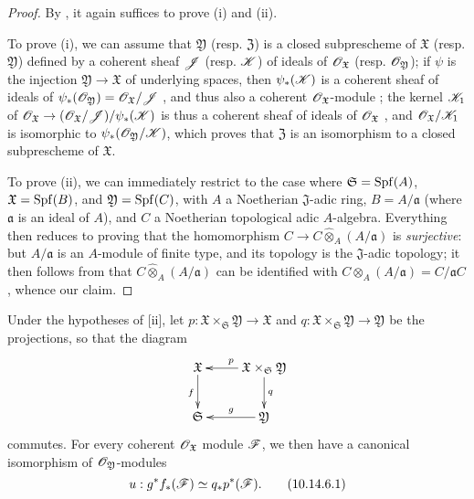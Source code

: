 \begin{proof}
\label{proof-1.10.14.5}
By , it again suffices to prove (i) and (ii).

To prove (i), we can assume that $\mathfrak{Y}$ (resp. $\mathfrak{Z}$) is a closed subprescheme of $\mathfrak{X}$ (resp. $\mathfrak{Y}$) defined by a coherent sheaf $\mathscr{J}$ (resp. $\mathscr{K}$) of ideals of $\mathscr{O}_\mathfrak{X}$ (resp. $\mathscr{O}_\mathfrak{Y}$);
if $\psi$ is the injection $\mathfrak{Y}\to\mathfrak{X}$ of underlying spaces, then $\psi_*(\mathscr{K})$ is a coherent sheaf of ideals of $\psi_*(\mathscr{O}_\mathfrak{Y})=\mathscr{O}_\mathfrak{X}/\mathscr{J}$ , and thus also a coherent $\mathscr{O}_\mathfrak{X}$-module ;
the kernel $\mathscr{K}_1$ of $\sh{O}_\mathfrak{X}\to(\sh{O}_\mathfrak{X}/\sh{J})/\psi_*(\sh{K})$ is thus a coherent sheaf of ideals of $\mathscr{O}_\mathfrak{X}$ , and $\mathscr{O}_\mathfrak{X}/\mathscr{K}_1$ is isomorphic to $\psi_*(\mathscr{O}_\mathfrak{Y}/\mathscr{K})$, which proves that $\mathfrak{Z}$ is an isomorphism to a closed subprescheme of $\mathfrak{X}$.

To prove (ii), we can immediately restrict to the case where $\mathfrak{S}=\operatorname{Spf}(A)$, $\mathfrak{X}=\operatorname{Spf}(B)$, and $\mathfrak{Y}=\operatorname{Spf}(C)$, with $A$ a Noetherian $\mathfrak{J}$-adic ring, $B=A/\mathfrak{a}$ (where $\mathfrak{a}$ is an ideal of $A$), and $C$ a Noetherian topological adic $A$-algebra.
Everything then reduces to proving that the homomorphism $C\to C\widehat{\otimes}_A(A/\mathfrak{a})$ is \emph{surjective}:
but $A/\mathfrak{a}$ is an $A$-module of finite type, and its topology is the $\mathfrak{J}$-adic topology;
it then follows from  that $C\widehat{\otimes}_A(A/\mathfrak{a})$ can be identified with $C\otimes_A(A/\mathfrak{a})=C/\mathfrak{a}C$, whence our claim.
\end{proof}

\begin{corollary}[10.14.6]
\label{1.10.14.6}
Under the hypotheses of [ii], let $p:\mathfrak{X}\times_\mathfrak{S}\mathfrak{Y}\to\mathfrak{X}$ and $q:\mathfrak{X}\times_\mathfrak{S}\mathfrak{Y}\to\mathfrak{Y}$ be the projections, so that the diagram
\[
  \xymatrix{
    \mathfrak{X}\ar[d]_f &
    \mathfrak{X}\times_\mathfrak{S}\mathfrak{Y}\ar[l]_p\ar[d]^q\\
    \mathfrak{S} &
    \mathfrak{Y}\ar[l]_g
  }
\]
commutes.
For every coherent $\mathscr{O}_\mathfrak{X}$ module $\mathscr{F}$, we then have a canonical isomorphism of $\mathscr{O}_\mathfrak{Y}$-modules
\[
\label{1.10.14.6.1}
  u:g^*f_*(\mathscr{F})\simeq q_*p^*(\mathscr{F}).
  \tag{10.14.6.1}
\]
\end{corollary}

